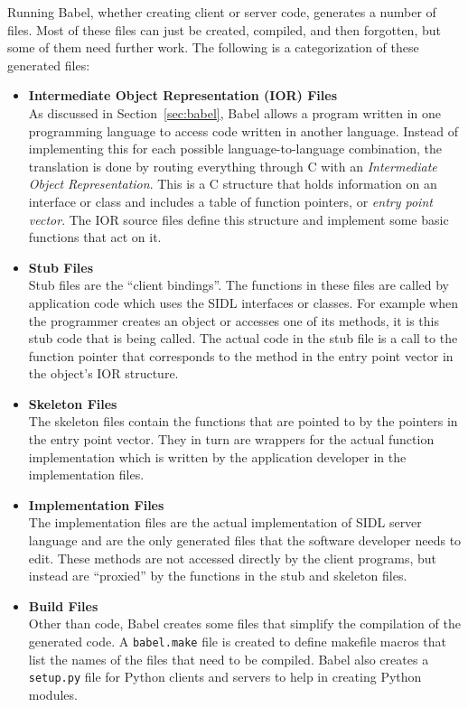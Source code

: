 \documentclass[doublespacing,12pt]{article}
\begin{document}
Running Babel, whether creating client or server code, generates a number of 
files.  Most of these files can just be created, compiled, and then 
forgotten, but some of them need further work.  The following is a 
categorization of these generated files:

\begin{itemize}

\item \textbf{Intermediate Object Representation (IOR) Files}\\
As discussed in Section~\ref{sec:babel}, Babel allows a program written in one
programming language to access code written in another language.  
Instead of implementing 
this for each possible language-to-language combination, the translation is
done by routing everything through C with an 
\textit{Intermediate Object Representation}.
This is a C structure that holds information on
an interface or class and includes a table of function pointers, or
\textit{entry point vector}.  The IOR source files
define this structure and implement some basic functions that act on it.

\item \textbf{Stub Files} \\
Stub files are the ``client bindings''.  The functions in these files are 
called by application code which uses the SIDL interfaces or classes.  For 
example when the programmer creates an object or accesses one of its methods,
it is this stub code that is being called.  The actual code in the stub file 
is a call to the function pointer that corresponds to the method 
in the entry point vector in the object's IOR structure.

\item \textbf{Skeleton Files} \\
The skeleton files contain the functions that are pointed to by the pointers
in the entry point vector.  They in turn are wrappers for the actual function
implementation which is written by the application developer in the 
implementation files.

\item \textbf{Implementation Files}\\
The implementation files are the actual implementation of SIDL 
server language and are the only generated files that the software developer
needs to edit.  These methods are not accessed directly by the client programs,
but instead are ``proxied'' by the functions in the stub and skeleton files.

\item \textbf{Build Files}\\
Other than code, Babel creates some files that simplify the compilation of 
the generated code.  A \texttt{babel.make} file is created to define makefile
macros that list the names of the files that need to be compiled.  Babel also
creates a \texttt{setup.py} file for Python clients and servers to help in
creating Python modules.
\end{itemize}
\end{document}
